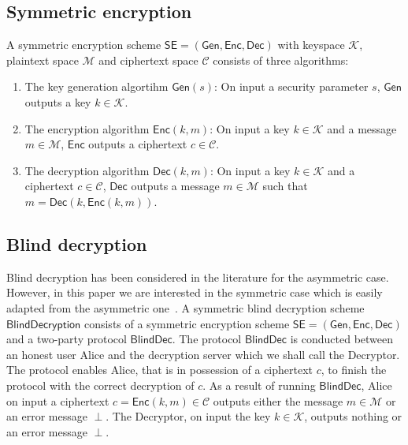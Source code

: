 \documentclass[10pt,journal]{IEEEtran}
\newcommand{\alg}[1]{\mathsf{#1}}
\newcommand{\sch}[1]{\mathsf{#1}}
\begin{document}
\subsection{Symmetric encryption}

A symmetric encryption scheme $\sch{SE} = (\alg{Gen},\alg{Enc},\alg{Dec})$
with keyspace $\mathcal{K}$, plaintext space $\mathcal{M}$ and ciphertext space $\mathcal{C}$
consists of three algorithms:
\begin{enumerate}
	\item The key generation algortihm $\alg{Gen}(s)$: On input a security parameter $s$, $\alg{Gen}$ outputs a key $k \in \mathcal{K}$.
	\item The encryption algorithm $\alg{Enc}(k,m)$: On input a key $k \in \mathcal{K}$ and a message $m \in \mathcal{M}$, $\alg{Enc}$ outputs a ciphertext $c \in \mathcal{C}$.
	\item The decryption algorithm $\alg{Dec}(k,m)$: On input a key $k \in \mathcal{K}$ and a ciphertext $c \in \mathcal{C}$, $\alg{Dec}$ outputs a message $m \in \mathcal{M}$
	such that $m = \alg{Dec}(k,\alg{Enc}(k,m))$.
\end{enumerate}




\subsection{Blind decryption}
\label{sec:Blind decryption}

Blind decryption has been considered in the literature for the asymmetric case.
However, in this paper we are interested in the symmetric case which is
easily adapted from the asymmetric one~\cite{Green_2011}.
A symmetric blind decryption scheme $\sch{BlindDecryption}$
consists of a symmetric
encryption scheme $\sch{SE} = (\alg{Gen},\alg{Enc},\alg{Dec})$
and a two-party protocol $\alg{BlindDec}$.
The protocol $\alg{BlindDec}$ is conducted between an honest user Alice and the decryption server which we shall call the Decryptor. The protocol
enables Alice, that is in possession of a ciphertext $c$, to finish the protocol
with the correct decryption of $c$.	
	As a result of running $\alg{BlindDec}$, Alice on input a ciphertext $c = \alg{Enc}(k,m) \in \mathcal{C}$
	outputs either the message $m \in \mathcal{M}$ or an error message $\perp$.
  The Decryptor, on input the key $k \in \mathcal{K}$, outputs nothing or an error message $\perp$.
\end{document}
